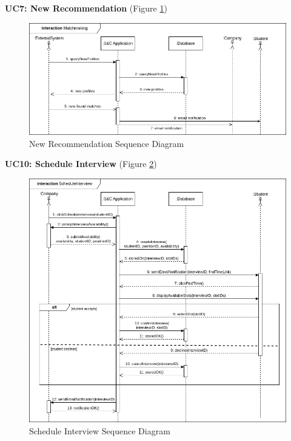 \textbf{UC7: New Recommendation} (Figure \ref{fig:matchmaking})
\begin{figure}[H]
\centering
\includegraphics[width=\textwidth]{Images/matchmaking_sequence.png}
\caption{\label{fig:matchmaking} New Recommendation Sequence Diagram}
\end{figure}



\textbf{UC10: Schedule Interview} (Figure \ref{fig:schedule_sequence})
\begin{figure}[H]
\centering
\includegraphics[width=\textwidth]{Images/schedule-interview_sequence.png}
\caption{\label{fig:schedule_sequence} Schedule Interview Sequence Diagram}
\end{figure}


